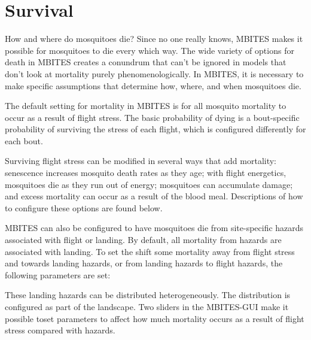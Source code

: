 \documentclass{article}
\newcommand{\ie}{{\em i.e., }}
\begin{document}
\clearpage 

\section{Survival}

How and where do mosquitoes die? Since no one really knows, MBITES makes it possible for mosquitoes to die every which way. The wide variety of options for death in MBITES creates a conundrum that can't be ignored in models that don't look at mortality purely phenomenologically. In MBITES, it is necessary to make specific assumptions that determine how, where, and when mosquitoes die. 

The default setting for mortality in MBITES is for all mosquito mortality to occur as a result of flight stress. The basic probability of dying is a bout-specific probability of surviving the stress of each flight, which is configured differently for each bout. 
%
%
Surviving flight stress can be modified in several ways that add mortality: senescence increases mosquito death rates as they age; with flight energetics, mosquitoes die as they run out of energy; mosquitoes can accumulate damage; and excess mortality can occur as a result of the blood meal. Descriptions of how to configure these options are found below.

MBITES can also be configured to have mosquitoes die from site-specific hazards associated with flight or landing. By default, all mortality from hazards are associated with landing. To set the shift some mortality away from flight stress and towards landing hazards, or from landing hazards to flight hazards, the following parameters are set:  
%
%
These landing hazards can be distributed heterogeneously. The distribution is configured as part of the landscape. Two sliders in the MBITES-GUI make it possible toset parameters to affect how much mortality occurs as a result of flight stress compared with hazards. 
\end{document}
